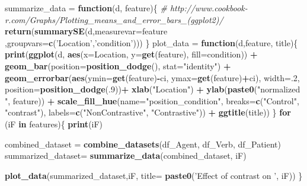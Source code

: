\documentclass[]{article}
\newenvironment{Shaded}{\begin{snugshade}}{\end{snugshade}}
\newcommand{\CommentTok}[1]{\textcolor[rgb]{0.56,0.35,0.01}{\textit{#1}}}
\newcommand{\ControlFlowTok}[1]{\textcolor[rgb]{0.13,0.29,0.53}{\textbf{#1}}}
\newcommand{\DataTypeTok}[1]{\textcolor[rgb]{0.13,0.29,0.53}{#1}}
\newcommand{\DecValTok}[1]{\textcolor[rgb]{0.00,0.00,0.81}{#1}}
\newcommand{\KeywordTok}[1]{\textcolor[rgb]{0.13,0.29,0.53}{\textbf{#1}}}
\newcommand{\NormalTok}[1]{#1}
\newcommand{\OperatorTok}[1]{\textcolor[rgb]{0.81,0.36,0.00}{\textbf{#1}}}
\newcommand{\StringTok}[1]{\textcolor[rgb]{0.31,0.60,0.02}{#1}}
\begin{document}
\begin{Shaded}
\begin{Highlighting}[]
\NormalTok{summarize_data =}\StringTok{ }\ControlFlowTok{function}\NormalTok{(d, feature)\{}
  \CommentTok{# http://www.cookbook-r.com/Graphs/Plotting_means_and_error_bars_(ggplot2)/}
  \KeywordTok{return}\NormalTok{(}\KeywordTok{summarySE}\NormalTok{(d,}\DataTypeTok{measurevar=}\NormalTok{feature ,}\DataTypeTok{groupvars=}\KeywordTok{c}\NormalTok{(}\StringTok{'Location'}\NormalTok{,}\StringTok{'condition'}\NormalTok{)))}
\NormalTok{\}}
\NormalTok{plot_data =}\StringTok{ }\ControlFlowTok{function}\NormalTok{(d,feature, title)\{}
  \KeywordTok{print}\NormalTok{(}\KeywordTok{ggplot}\NormalTok{(d, }\KeywordTok{aes}\NormalTok{(}\DataTypeTok{x=}\NormalTok{Location, }\DataTypeTok{y=}\KeywordTok{get}\NormalTok{(feature), }\DataTypeTok{fill=}\NormalTok{condition)) }\OperatorTok{+}\StringTok{ }
\StringTok{    }\KeywordTok{geom_bar}\NormalTok{(}\DataTypeTok{position=}\KeywordTok{position_dodge}\NormalTok{(), }\DataTypeTok{stat=}\StringTok{"identity"}\NormalTok{) }\OperatorTok{+}
\StringTok{    }\KeywordTok{geom_errorbar}\NormalTok{(}\KeywordTok{aes}\NormalTok{(}\DataTypeTok{ymin=}\KeywordTok{get}\NormalTok{(feature)}\OperatorTok{-}\NormalTok{ci, }\DataTypeTok{ymax=}\KeywordTok{get}\NormalTok{(feature)}\OperatorTok{+}\NormalTok{ci),}
                  \DataTypeTok{width=}\NormalTok{.}\DecValTok{2}\NormalTok{,                   }
                  \DataTypeTok{position=}\KeywordTok{position_dodge}\NormalTok{(.}\DecValTok{9}\NormalTok{))}\OperatorTok{+}
\StringTok{    }\KeywordTok{xlab}\NormalTok{(}\StringTok{"Location"}\NormalTok{) }\OperatorTok{+}
\StringTok{    }\KeywordTok{ylab}\NormalTok{(}\KeywordTok{paste0}\NormalTok{(}\StringTok{"normalized "}\NormalTok{, feature)) }\OperatorTok{+}
\StringTok{    }\KeywordTok{scale_fill_hue}\NormalTok{(}\DataTypeTok{name=}\StringTok{"position_condition"}\NormalTok{, }
                   \DataTypeTok{breaks=}\KeywordTok{c}\NormalTok{(}\StringTok{"Control"}\NormalTok{, }\StringTok{"contrast"}\NormalTok{),}
                   \DataTypeTok{labels=}\KeywordTok{c}\NormalTok{(}\StringTok{"NonContrastive"}\NormalTok{, }\StringTok{"Contrastive"}\NormalTok{)) }\OperatorTok{+}
\StringTok{    }\KeywordTok{ggtitle}\NormalTok{(title))}
\NormalTok{\}}
\ControlFlowTok{for}\NormalTok{ (iF }\ControlFlowTok{in}\NormalTok{ features)\{}
  \KeywordTok{print}\NormalTok{(iF)}
  
\NormalTok{  combined_dataset =}\StringTok{ }\KeywordTok{combine_datasets}\NormalTok{(df_Agent, df_Verb, df_Patient)}
\NormalTok{  summarized_dataset=}\StringTok{ }\KeywordTok{summarize_data}\NormalTok{(combined_dataset, iF)}
  
  
  \KeywordTok{plot_data}\NormalTok{(summarized_dataset,iF, }\DataTypeTok{title=} \KeywordTok{paste0}\NormalTok{(}\StringTok{'Effect of contrast on '}\NormalTok{, iF))}
\NormalTok{\}}
\end{Highlighting}
\end{Shaded}
\end{document}
